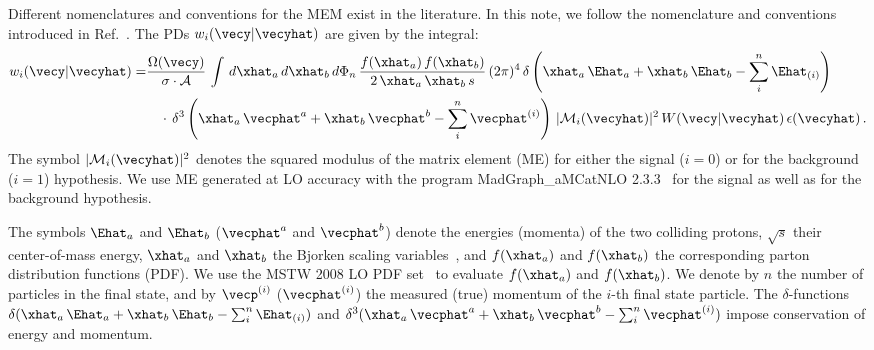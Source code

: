 Different nomenclatures and conventions for the MEM exist in the literature.
In this note, we follow the nomenclature and conventions introduced in Ref.~\cite{Volobouev:2011vb}.
The PDs $w_{i}(\vecy|\vecyhat)$ are given by the integral:
\begin{align}
w_{i}(\vecy|\vecyhat) = & \frac{\Omega(\vecy)}{\sigma \cdot \mathcal{A}} \, \int \, d\xhat_{a} \, d\xhat_{b} \,
  d\Phi_{n} \, \frac{f(\xhat_{a}) \, f(\xhat_{b})}{2 \, \xhat_{a} \, \xhat_{b} \, s} \, (2\pi)^{4} \,
  \delta\left( \xhat_{a} \, \Ehat_{a} + \xhat_{b} \, \Ehat_{b} - \sum_{i}^{n} \Ehat_{(i)} \right) \nonumber \\
 & \quad \cdot \, \delta^{3}\left( \xhat_{a} \, \vecphat^{a} + \xhat_{b} \, \vecphat^{b} - \sum_{i}^{n} \vecphat^{(i)}\right) \, 
  \vert \mathcal{M}_{i}(\vecyhat) \vert^{2} \, W(\vecy|\vecyhat) \, \epsilon(\vecyhat) \, .
\label{eq:mem1}
\end{align}
The symbol $\vert \mathcal{M}_{i}(\vecyhat) \vert^{2}$ denotes the squared modulus of the matrix element (ME) for either the signal ($i=0$) or for the background ($i=1$) hypothesis.
We use ME generated at LO accuracy with the program MadGraph\_aMCatNLO 2.3.3~\cite{MadGraph_aMCatNLO} for the signal as well as for the background hypothesis.

The symbols $\Ehat_{a}$ and $\Ehat_{b}$ ($\vecphat^{a}$ and $\vecphat^{b}$) denote the energies (momenta) of the two colliding protons,
$\sqrt{s}$ their center-of-mass energy,
$\xhat_{a}$ and $\xhat_{b}$ the Bjorken scaling variables~\cite{Bjorkenx},
and $f(\xhat_{a})$ and $f(\xhat_{b})$ the corresponding parton distribution functions (PDF).
We use the MSTW 2008 LO PDF set~\cite{MSTW} to evaluate $f(\xhat_{a})$ and $f(\xhat_{b})$.
We denote by $n$ the number of particles in the final state,
and by $\vecp^{(i)}$ ($\vecphat^{(i)}$) the measured (true) momentum of the $i$-th final state particle. 
The $\delta$-functions $\delta( \xhat_{a} \, \Ehat_{a} + \xhat_{b} \, \Ehat_{b} - \sum_{i}^{n} \Ehat_{(i)})$
and $\delta^{3}( \xhat_{a} \, \vecphat^{a} + \xhat_{b} \, \vecphat^{b} - \sum_{i}^{n} \vecphat^{(i)})$ 
impose conservation of energy and momentum.

